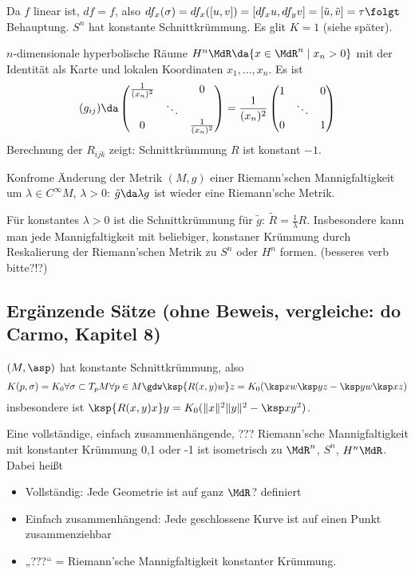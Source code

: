 \documentclass[a4paper,twoside,DIV15,BCOR12mm]{scrbook}
\begin{document}
\begin{bemerkungen}
\begin{beweis}
Da $f$ linear ist, $df=f$, also $df_x(\sigma) = df_x([u,v]) = [df_xu, df_yv] = [\tilde u, \tilde v] = \tau \folgt$ Behauptung. $S^n$ hat konstante Schnittkrümmung. Es glit $K=1$ (siehe später).
\end{beweis}

\item $n$-dimensionale hyperbolische Räume $H^n\MdR \da \{ x\in\MdR^n \mid x_n > 0\}$ mit der Identität als Karte und lokalen Koordinaten $x_1,\ldots,x_n$. Es ist
\[
(g_{ij}) \da 
\begin{pmatrix}
\frac{1}{(x_n)^2} & & 0 \\
& \ddots & \\
0 & & \frac 1 {(x_n)^2}
\end{pmatrix} = \frac 1 {(x_n)^2} 
\begin{pmatrix}
1 & & 0 \\
& \ddots & \\
0 & & 1
\end{pmatrix}
\] Berechnung der $R_{ijk}$ zeigt: Schnittkrümmung $R$ ist konstant $-1$.

\item Konfrome Änderung der Metrik $(M,g)$ einer Riemann’schen Mannigfaltigkeit um $\lambda \in C^\infty M$, $\lambda >0$: $\tilde g \da \lambda g$ ist wieder eine Riemann’sche Metrik.

Für konstantes $\lambda>0$ ist die Schnittkrümmung für $\tilde g$: $\tilde R=\frac 1\lambda R$. Insbesondere kann man jede Mannigfaltigkeit mit beliebiger, konstaner Krümmung durch Reskalierung der Riemann’schen Metrik zu $S^n$ oder $H^n$ formen. (besseres verb bitte?!?)

\end{bemerkungen}

\subsection*{Ergänzende Sätze (ohne Beweis, vergleiche: do Carmo, Kapitel 8)}

\begin{satz*}
$(M, \asp)$ hat konstante Schnittkrümmung, also
\[ K(p,\sigma) = K_0 \forall \sigma \subset T_pM
\forall p \in M \gdw \ksp {R(x,y)w} z = K_0 (\ksp x w \ksp y z - \ksp y w \ksp x z)
\]
insbesondere ist $\ksp {R(x,y)x} y = K_0(\|x\|^2\|y\|^2 - \ksp x y ^2)$.
\end{satz*}

\begin{satz*}[Hopf]
Eine vollständige, einfach zusammenhängende, ??? Riemann’sche Mannigfaltigkeit mit konstanter Krümmung 0,1 oder -1 ist isometrisch zu $\MdR^n$, $S^n$, $H^n\MdR$. Dabei heißt
\begin{itemize}
\item Vollständig: Jede Geometrie ist auf ganz $\MdR$? definiert
\item Einfach zusammenhängend: Jede geschlossene Kurve ist auf einen Punkt zusammenziehbar
\item „???“ = Riemann’sche Mannigfaltigkeit konstanter Krümmung.
\end{itemize}

\end{satz*}
\end{document}
